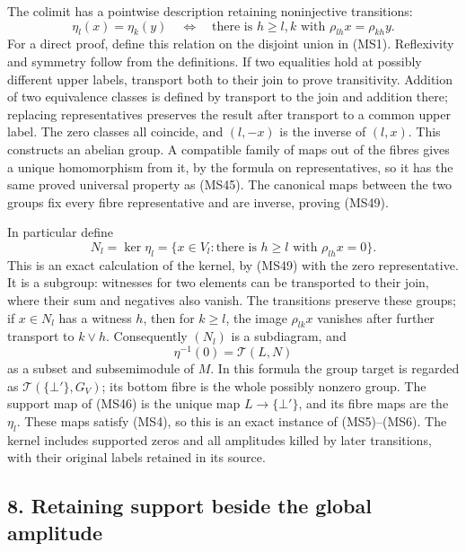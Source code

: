 \documentclass[
]{article}
\begin{document}
The colimit has a pointwise description retaining noninjective
transitions: \[
\eta_l(x)=\eta_k(y)
\quad\Longleftrightarrow\quad
\text{there is }h\ge l,k\text{ with }\rho_{lh}x=\rho_{kh}y.
\tag{MS49}
\] For a direct proof, define this relation on the disjoint union in
(MS1). Reflexivity and symmetry follow from the definitions. If two
equalities hold at possibly different upper labels, transport both to
their join to prove transitivity. Addition of two equivalence classes is
defined by transport to the join and addition there; replacing
representatives preserves the result after transport to a common upper
label. The zero classes all coincide, and \((l,-x)\) is the inverse of
\((l,x)\). This constructs an abelian group. A compatible family of maps
out of the fibres gives a unique homomorphism from it, by the formula on
representatives, so it has the same proved universal property as (MS45).
The canonical maps between the two groups fix every fibre representative
and are inverse, proving (MS49).

In particular define \[
N_l=\ker\eta_l
=\{x\in V_l:\text{there is }h\ge l\text{ with }\rho_{lh}x=0\}.
\tag{MS50}
\] This is an exact calculation of the kernel, by (MS49) with the zero
representative. It is a subgroup: witnesses for two elements can be
transported to their join, where their sum and negatives also vanish.
The transitions preserve these groups; if \(x\in N_l\) has a witness
\(h\), then for \(k\ge l\), the image \(\rho_{lk}x\) vanishes after
further transport to \(k\vee h\). Consequently \((N_l)\) is a
subdiagram, and \[
\eta^{-1}(0)=\mathcal T(L,N)
\tag{MS51}
\] as a subset and subsemimodule of \(M\). In this formula the group
target is regarded as \(\mathcal T(\{\bot'\},G_V)\); its bottom fibre is
the whole possibly nonzero group. The support map of (MS46) is the
unique map \(L\to\{\bot'\}\), and its fibre maps are the \(\eta_l\).
These maps satisfy (MS4), so this is an exact instance of (MS5)--(MS6).
The kernel includes supported zeros and all amplitudes killed by later
transitions, with their original labels retained in its source.

\subsection{8. Retaining support beside the global
amplitude}\label{retaining-support-beside-the-global-amplitude}
\end{document}
